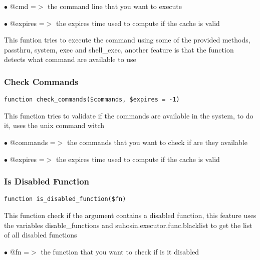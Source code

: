 \documentclass[a4paper]{article}
\begin{document}
\begin{compactitem}
\item[\color{myblue}$\bullet$] @cmd     =$>$ the command line that you want to execute
\item[\color{myblue}$\bullet$] @expires =$>$ the expires time used to compute if the cache is valid
\end{compactitem}

This funtion tries to execute the command using some of the
provided methods, passthru, system, exec and shell\_exec, another
feature is that the function detects what command are available
to use

\hypertarget{toc124}{}
\subsubsection{Check Commands}

\begin{lstlisting}
function check_commands($commands, $expires = -1)
\end{lstlisting}

This function tries to validate if the commands are available
in the system, to do it, uses the unix command witch

\begin{compactitem}
\item[\color{myblue}$\bullet$] @commands =$>$ the commands that you want to check if are they available
\item[\color{myblue}$\bullet$] @expires  =$>$ the expires time used to compute if the cache is valid
\end{compactitem}

\hypertarget{toc125}{}
\subsubsection{Is Disabled Function}

\begin{lstlisting}
function is_disabled_function($fn)
\end{lstlisting}

This function check if the argument contains a disabled
function, this feature uses the variables disable\_functions
and suhosin.executor.func.blacklist to get the list of all
disabled functions

\begin{compactitem}
\item[\color{myblue}$\bullet$] @fn =$>$ the function that you want to check if is it disabled
\end{compactitem}
\end{document}
